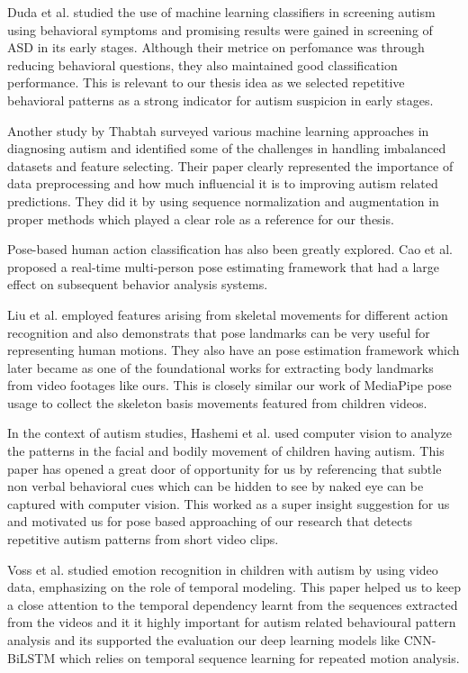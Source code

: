 Duda et al. \cite{duda2016use} studied the use of machine learning classifiers in screening autism using behavioral symptoms and promising results were gained in screening of ASD in its early stages. Although their metrice on perfomance was through reducing behavioral questions, they also maintained good classification performance. This is relevant to our thesis idea as we selected repetitive behavioral patterns as a strong indicator for autism suspicion in early stages.

Another study by Thabtah \cite{thabtah2018machine} surveyed various machine learning approaches in diagnosing autism and identified some of the challenges in handling imbalanced datasets and feature selecting. Their paper clearly represented the importance of data preprocessing and how much influencial it is to improving autism related predictions. They did it by using sequence normalization and augmentation in proper methods which played a clear role as a reference for our thesis. 

Pose-based human action classification has also been greatly explored. Cao et al. \cite{cao2017realtime} proposed a real-time multi-person pose estimating framework that had a large effect on subsequent behavior analysis systems. 

Liu et al. \cite{liu2019skeleton} employed features arising from skeletal movements for different action recognition and also demonstrats that pose landmarks can be very useful for representing human motions. They also have an pose estimation framework which later became as one of the foundational works for extracting body landmarks from video footages like ours. This is closely similar our work of MediaPipe pose usage to collect the skeleton basis movements featured from children videos.

In the context of autism studies, Hashemi et al. \cite{hashemi2014computer} used computer vision to analyze the patterns in the facial and bodily movement of children having autism. This paper has opened a great door of opportunity for us by referencing that subtle non verbal behavioral cues which can be hidden to see by naked eye can be captured with computer vision. This worked as a super insight suggestion for us and motivated us for pose based approaching of our research that detects repetitive autism patterns from short video clips.


Voss et al. \cite{voss2019emotion} studied emotion recognition in children with autism by using video data, emphasizing on the role of temporal modeling. This paper helped us to keep a close attention to the temporal dependency learnt from the sequences extracted from the videos and it it highly important for autism related behavioural pattern analysis and its supported the evaluation our deep learning models like CNN-BiLSTM which relies on temporal sequence learning for repeated motion analysis.

